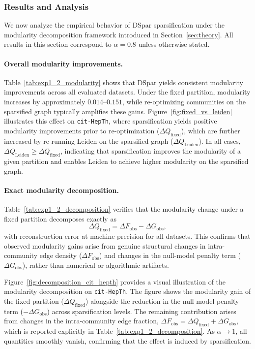 \documentclass[10pt,journal,compsoc]{IEEEtran}
\begin{document}
\subsubsection{Results and Analysis}

We now analyze the empirical behavior of DSpar sparsification under the modularity decomposition framework introduced in Section~\ref{sec:theory}. All results in this section correspond to $\alpha = 0.8$ unless otherwise stated.

\paragraph{Overall modularity improvements.}
Table~\ref{tab:exp1_2_modularity} shows that DSpar yields consistent modularity improvements across all evaluated datasets. Under the fixed partition, modularity increases by approximately $0.014$--$0.151$, while re-optimizing communities on the sparsified graph typically amplifies these gains. Figure~\ref{fig:fixed_vs_leiden} illustrates this effect on \texttt{cit-HepTh}, where sparsification yields positive modularity improvements prior to re-optimization ($\Delta Q_{\mathrm{fixed}}$), which are further increased by re-running Leiden on the sparsified graph ($\Delta Q_{\mathrm{Leiden}}$). In all cases, $\Delta Q_{\mathrm{Leiden}} \ge \Delta Q_{\mathrm{fixed}}$, indicating that sparsification improves the modularity of a given partition and enables Leiden to achieve higher modularity on the sparsified graph.

\paragraph{Exact modularity decomposition.}
Table~\ref{tab:exp1_2_decomposition} verifies that the modularity change under a fixed partition decomposes exactly as
\[
\Delta Q_{\mathrm{fixed}} = \Delta F_{\mathrm{obs}} - \Delta G_{\mathrm{obs}},
\]
with reconstruction error at machine precision for all datasets.
This confirms that observed modularity gains arise from genuine structural changes in intra-community edge density ($\Delta F_{\mathrm{obs}}$) and changes in the null-model penalty term ($\Delta G_{\mathrm{obs}}$), rather than numerical or algorithmic artifacts.

Figure~\ref{fig:decomposition_cit_hepth} provides a visual illustration of the modularity decomposition on \texttt{cit-HepTh}. 
The figure shows the modularity gain of the fixed partition ($\Delta Q_{\mathrm{fixed}}$) alongside the reduction in the null-model penalty term ($-\Delta G_{\mathrm{obs}}$) across sparsification levels. 
The remaining contribution arises from changes in the intra-community edge fraction, $\Delta F_{\mathrm{obs}} = \Delta Q_{\mathrm{fixed}} + \Delta G_{\mathrm{obs}}$, which is reported explicitly in Table~\ref{tab:exp1_2_decomposition}. 
As $\alpha \to 1$, all quantities smoothly vanish, confirming that the effect is induced by sparsification.
\end{document}
